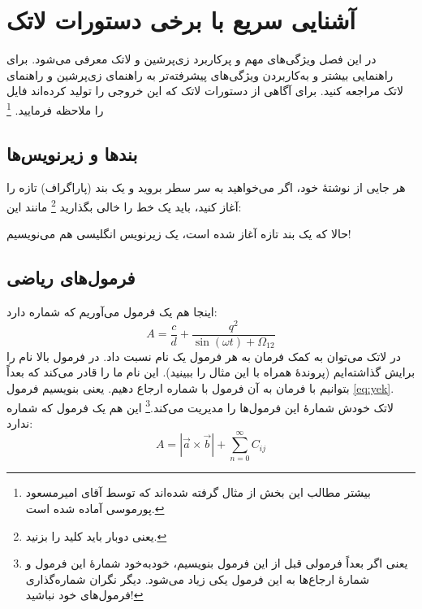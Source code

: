     
\let\Chapter\chapter
    
\chapter{آشنایی سریع با برخی دستورات لاتک}
\label{app:latexIntro}
در این فصل ویژگی‌های مهم و پرکاربرد زی‌پرشین و لاتک معرفی می‌شود. برای راهنمایی بیشتر و به‌کاربردن ویژگی‌های پیشرفته‌تر به راهنمای زی‌پرشین و راهنمای لاتک مراجعه کنید. برای آگاهی از دستورات لاتک که این خروجی را تولید کرده‌اند فایل  را ملاحظه فرمایید.
\footnote{بیشتر مطالب این بخش از مثال 
گرفته شده‌اند که توسط آقای امیرمسعود پورموسی آماده شده است.}

\section{بندها و زیرنویس‌ها}
هر جایی از نوشتهٔ خود، اگر می‌خواهید به سر سطر بروید و یک بند (پاراگراف) تازه را آغاز کنید، باید یک خط را خالی بگذارید%
\footnote{یعنی دوبار باید کلید  را بزنید.}
 مانند این:

حالا که یک بند تازه آغاز شده است، یک زیرنویس انگلیسی%
 هم می‌نویسیم!
\section{فرمول‌های ریاضی}
\label{formula}

اینجا هم یک فرمول می‌آوریم که شماره دارد:
\begin{equation}\label{eq:yek}
A=\frac{c}{d}+\frac{q^2}{\sin(\omega t)+\Omega_{12}}
\end{equation}
در لاتک می‌توان به کمک فرمان 
به هر فرمول یک نام نسبت داد. در فرمول بالا نام  را برایش گذاشته‌ایم (پروندهٔ  همراه با این مثال را ببینید). این نام ما را قادر می‌کند که بعداً بتوانیم با فرمان
به آن فرمول با شماره ارجاع دهیم. یعنی بنویسیم فرمول \ref{eq:yek}. 
لاتک خودش شمارهٔ این فرمول‌ها را مدیریت می‌کند.\footnote{یعنی اگر بعداً فرمولی قبل از این فرمول بنویسیم، خودبه‌خود شمارهٔ این فرمول و شمارهٔ ارجاع‌ها به این فرمول یکی زیاد می‌شود. دیگر نگران شماره‌گذاری فرمول‌های خود نباشید!} این هم یک فرمول که شماره ندارد:
$$A=|\vec{a}\times \vec{b}| + \sum_{n=0}^\infty C_{ij}$$

